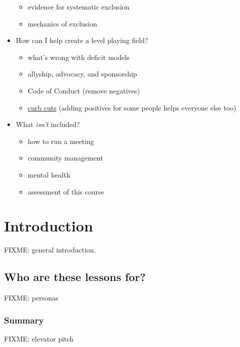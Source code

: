 \documentclass[]{Nemilov}
\providecommand{\tightlist}{%
  \setlength{\itemsep}{0pt}\setlength{\parskip}{0pt}}
\begin{document}
\begin{itemize}
  \begin{itemize}
  \tightlist
  \item
    evidence for systematic exclusion
  \item
    mechanics of exclusion
  \end{itemize}
\item
  How can I help create a level playing field?

  \begin{itemize}
  \tightlist
  \item
    what's wrong with deficit models
  \item
    allyship, advocacy, and sponsorship
  \item
    Code of Conduct (remove negatives)
  \item
    \href{glossary.html\#curb-cuts}{curb cuts} (adding positives for some people helps everyone else too)
  \end{itemize}
\item
  What \emph{isn't} included?

  \begin{itemize}
  \tightlist
  \item
    how to run a meeting
  \item
    community management
  \item
    mental health
  \item
    assessment of this course
  \end{itemize}
\end{itemize}

\hypertarget{py-intro}{%
\chapter{Introduction}\label{py-intro}}

FIXME: general introduction.

\hypertarget{py-intro-personas}{%
\section{Who are these lessons for?}\label{py-intro-personas}}

FIXME: personas

\hypertarget{summary}{%
\subsection{Summary}\label{summary}}

FIXME: elevator pitch
\end{document}

